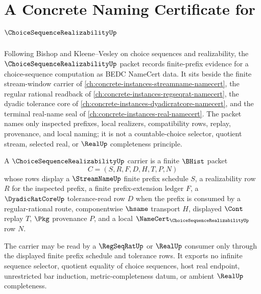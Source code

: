 \chapter{A Concrete Naming Certificate for $\ChoiceSequenceRealizabilityUp$}
\label{ch:concrete-instances-choice-sequence-realizability-namecert}

Following Bishop and Kleene--Vesley on choice sequences and realizability, the $\ChoiceSequenceRealizabilityUp$ packet records finite-prefix evidence for a choice-sequence computation as BEDC NameCert data. It sits beside the finite stream-window carrier of \autoref{ch:concrete-instances-streamname-namecert}, the regular rational readback of \autoref{ch:concrete-instances-regseqrat-namecert}, the dyadic tolerance core of \autoref{ch:concrete-instances-dyadicratcore-namecert}, and the terminal real-name seal of \autoref{ch:concrete-instances-real-namecert}. The packet names only inspected prefixes, local realizers, compatibility rows, replay, provenance, and local naming; it is not a countable-choice selector, quotient stream, selected real, or $\RealUp$ completeness principle.

\begin{definition}
\label{def:choice-sequence-realizability-carrier}
A $\ChoiceSequenceRealizabilityUp$ carrier is a finite $\BHist$ packet
$$
C=(S,R,F,D,H,T,P,N)
$$
whose rows display a $\StreamNameUp$ finite prefix schedule $S$, a realizability row $R$ for the inspected prefix, a finite prefix-extension ledger $F$, a $\DyadicRatCoreUp$ tolerance-read row $D$ when the prefix is consumed by a regular-rational route, componentwise $\hsame$ transport $H$, displayed $\Cont$ replay $T$, $\Pkg$ provenance $P$, and a local $\NameCert_{\ChoiceSequenceRealizabilityUp}$ row $N$.

The carrier may be read by a $\RegSeqRatUp$ or $\RealUp$ consumer only through the displayed finite prefix schedule and tolerance rows. It exports no infinite sequence selector, quotient equality of choice sequences, host real endpoint, unrestricted bar induction, metric-completeness datum, or ambient $\RealUp$ completeness.
\end{definition}

